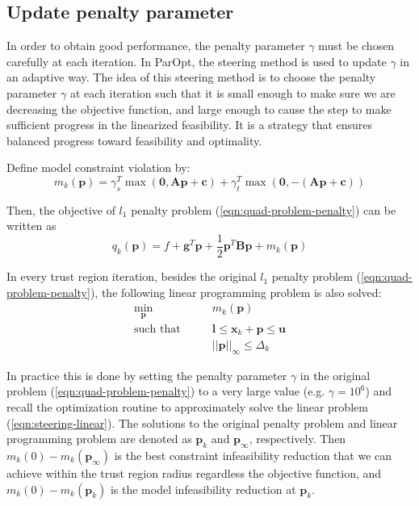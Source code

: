 \documentclass[12pt]{article}
\newcommand{\mb}{\mathbf}
\begin{document}
\subsection{Update penalty parameter}
In order to obtain good performance, the penalty parameter $\gamma$ must be chosen carefully at each iteration. In ParOpt, the steering method is used to update $\gamma$ in an adaptive way. The idea of this steering method is to choose the penalty parameter $\gamma$ at each iteration such that it is small enough to make sure we are decreasing the objective function, and large enough to cause the step to make sufficient progress in the linearized feasibility. It is a strategy that ensures balanced progress toward feasibility and optimality.

Define model constraint violation by:
\begin{equation}
    m_k(\mb{p}) = \gamma_s^T \max(\mb{0}, \mb{A}\mb{p} + \mb{c}) + \gamma_t^T \max(\mb{0}, -(\mb{A}\mb{p} + \mb{c}))
\end{equation}

Then, the objective of $l_1$ penalty problem (\ref{eqn:quad-problem-penalty}) can be written as
\begin{equation}
    q_k(\mb{p}) = f + \mb{g}^T\mb{p} + \frac{1}{2}\mb{p}^T\mb{B}\mb{p} + m_k(\mb{p})
\end{equation}

In every trust region iteration, besides the original $l_1$ penalty problem (\ref{eqn:quad-problem-penalty}), the following linear programming problem is also solved:
\begin{equation}
  \label{eqn:steering-linear}
  \begin{aligned}
    \min_{\mb{p}} \qquad & m_k(\mb{p})\\
    \text{such that} \qquad
    & \mb{l} \le \mb{x}_k + \mb{p} \le \mb{u} \\
    & ||\mb{p}||_\infty \le \Delta_k
  \end{aligned}
\end{equation}

In practice this is done by setting the penalty parameter $\gamma$ in the original problem (\ref{eqn:quad-problem-penalty}) to a very large value (e.g. $\gamma = 10^6$) and recall the optimization routine to approximately solve the linear problem (\ref{eqn:steering-linear}). The solutions to the original penalty problem and linear programming problem are denoted as $\mb{p}_k$ and $\mb{p}_\infty$, respectively. Then $m_k(0) - m_k(\mb{p}_\infty)$ is the best constraint infeasibility reduction that we can achieve within the trust region radius regardless the objective function, and $m_k(0) - m_k(\mb{p}_k)$ is the model infeasibility reduction at $\mb{p}_k$.
\end{document}

